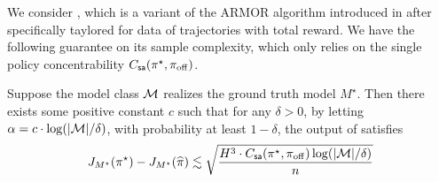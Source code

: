 \documentclass{article}
\begin{document}
We consider , which is a variant of the ARMOR algorithm introduced in \citet{xie2022armor} after specifically taylored for data of trajectories with total reward. We have the following guarantee on its sample complexity, which only relies on the single policy concentrability $C_{\mathsf{sa}}(\pi^\star, \pi_{\mathrm{off}})$.
\begin{theorem}\label{thm: armor}
    Suppose the model class $\mathcal{M}$ realizes the ground truth model $M^\star$. Then there exists some positive constant $c$ such that for any $\delta > 0$, by letting $\alpha = c\cdot \log(|\mathcal{M}|/\delta)$, with probability at least $1 - \delta$, the output of  satisfies 
    $$J_{M^\star}(\pi^\star) - J_{M^\star}(\widehat{\pi})\lesssim \sqrt{\frac{H^3\cdot C_{\mathsf{sa}}(\pi^\star, \pi_{\mathrm{off}})\log(|\mathcal{M}| / \delta)}{n}}$$
\end{theorem}
\end{document}
